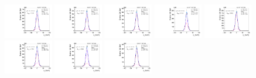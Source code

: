 \begin{figure}[htb]
\includegraphics[width=0.19\textwidth]{plots/Appendix_Recoil_Fits/WmpMC_PF_13TeV_2G/pfu2fit_24.pdf}
\includegraphics[width=0.19\textwidth]{plots/Appendix_Recoil_Fits/WmpMC_PF_13TeV_2G/pfu2fit_25.pdf}
\includegraphics[width=0.19\textwidth]{plots/Appendix_Recoil_Fits/WmpMC_PF_13TeV_2G/pfu2fit_26.pdf}
\includegraphics[width=0.19\textwidth]{plots/Appendix_Recoil_Fits/WmpMC_PF_13TeV_2G/pfu2fit_27.pdf}
\includegraphics[width=0.19\textwidth]{plots/Appendix_Recoil_Fits/WmpMC_PF_13TeV_2G/pfu2fit_28.pdf}
\includegraphics[width=0.19\textwidth]{plots/Appendix_Recoil_Fits/WmpMC_PF_13TeV_2G/pfu2fit_29.pdf}
\includegraphics[width=0.19\textwidth]{plots/Appendix_Recoil_Fits/WmpMC_PF_13TeV_2G/pfu2fit_30.pdf}
\includegraphics[width=0.19\textwidth]{plots/Appendix_Recoil_Fits/WmpMC_PF_13TeV_2G/pfu2fit_31.pdf}

\end{figure}
